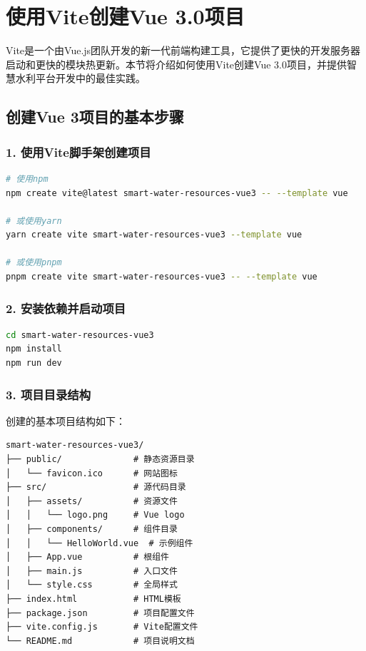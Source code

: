\section{使用Vite创建Vue
3.0项目}\label{ux4f7fux7528viteux521bux5efavue-3.0ux9879ux76ee}

Vite是一个由Vue.js团队开发的新一代前端构建工具，它提供了更快的开发服务器启动和更快的模块热更新。本节将介绍如何使用Vite创建Vue
3.0项目，并提供智慧水利平台开发中的最佳实践。

\subsection{创建Vue
3项目的基本步骤}\label{ux521bux5efavue-3ux9879ux76eeux7684ux57faux672cux6b65ux9aa4}

\subsubsection{1.
使用Vite脚手架创建项目}\label{ux4f7fux7528viteux811aux624bux67b6ux521bux5efaux9879ux76ee}

\begin{lstlisting}[language=bash]
# 使用npm
npm create vite@latest smart-water-resources-vue3 -- --template vue

# 或使用yarn
yarn create vite smart-water-resources-vue3 --template vue

# 或使用pnpm
pnpm create vite smart-water-resources-vue3 -- --template vue
\end{lstlisting}

\subsubsection{2.
安装依赖并启动项目}\label{ux5b89ux88c5ux4f9dux8d56ux5e76ux542fux52a8ux9879ux76ee}

\begin{lstlisting}[language=bash]
cd smart-water-resources-vue3
npm install
npm run dev
\end{lstlisting}

\subsubsection{3.
项目目录结构}\label{ux9879ux76eeux76eeux5f55ux7ed3ux6784}

创建的基本项目结构如下：

\begin{lstlisting}
smart-water-resources-vue3/
├── public/              # 静态资源目录
│   └── favicon.ico      # 网站图标
├── src/                 # 源代码目录
│   ├── assets/          # 资源文件
│   │   └── logo.png     # Vue logo
│   ├── components/      # 组件目录
│   │   └── HelloWorld.vue  # 示例组件
│   ├── App.vue          # 根组件
│   ├── main.js          # 入口文件
│   └── style.css        # 全局样式
├── index.html           # HTML模板
├── package.json         # 项目配置文件
├── vite.config.js       # Vite配置文件
└── README.md            # 项目说明文档
\end{lstlisting}

